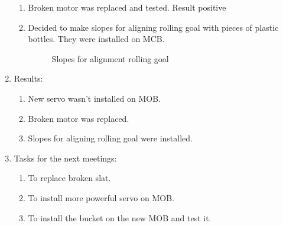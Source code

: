 \begin{enumerate}
\begin{enumerate}
		\item Broken motor was replaced and tested. Result positive
		
		\item Decided to make slopes for aligning rolling goal with pieces of plastic bottles. They were installed on MCB. 
		\begin{figure}[H]
			\begin{minipage}[h]{1\linewidth}
				\caption{Slopes for alignment rolling goal}
			\end{minipage}
		\end{figure}	
		
	\end{enumerate}
	\item Results:
	\begin{enumerate}
		
		\item New servo wasn't installed on MOB.
		
		\item Broken motor was replaced.
		
		\item Slopes for aligning rolling goal were installed.
		
	\end{enumerate}
	\item Tasks for the next meetings:
	\begin{enumerate}
		
		\item To replace broken slat.
		
		\item To install more powerful servo on MOB.
		
		\item To install the bucket on the new MOB and test it.
		
	\end{enumerate}
\end{enumerate}
\fillpage